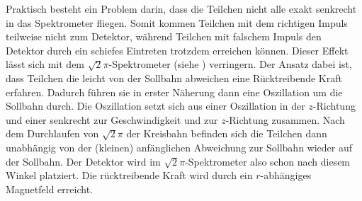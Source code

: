 Praktisch besteht ein Problem darin, dass die Teilchen nicht alle exakt senkrecht in das Spektrometer fliegen. Somit kommen Teilchen mit dem richtigen Impuls teilweise nicht zum Detektor, während Teilchen mit falschem Impuls den Detektor durch ein schiefes Eintreten trotzdem erreichen können. Dieser Effekt lässt sich mit dem $\sqrt{2}\pi$-Spektrometer (siehe \cite{MAHLEIN1967229}) verringern. Der Ansatz dabei ist, dass Teilchen die leicht von der Sollbahn abweichen eine Rücktreibende Kraft erfahren. Dadurch führen sie in erster Näherung dann eine Oszillation um die Sollbahn durch. Die Oszillation setzt sich aus einer Oszillation in der $z$-Richtung und einer senkrecht zur Geschwindigkeit und zur $z$-Richtung zusammen. Nach dem Durchlaufen von $\sqrt{2}\pi$ der Kreisbahn befinden sich die Teilchen dann unabhängig von der (kleinen) anfänglichen Abweichung zur Sollbahn wieder auf der Sollbahn. Der Detektor wird im $\sqrt{2}\pi$-Spektrometer also schon nach diesem Winkel platziert. Die rücktreibende Kraft wird durch ein $r$-abhängiges Magnetfeld erreicht.

\newpage
